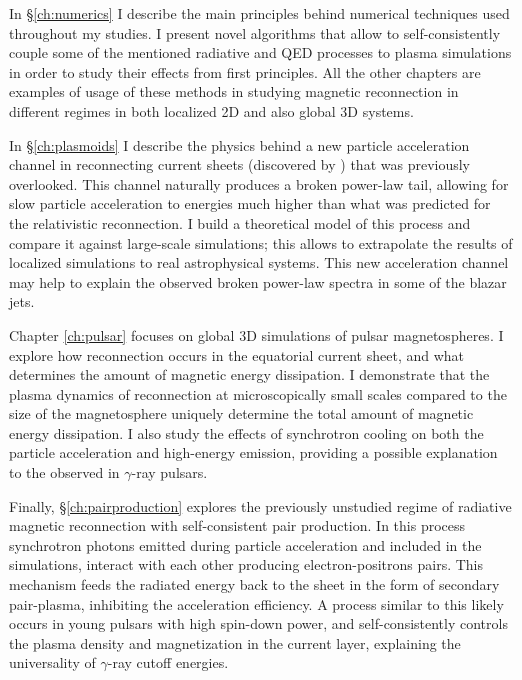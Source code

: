 In \S\ref{ch:numerics} I describe the main principles behind numerical techniques used throughout my studies. I present novel algorithms that allow to self-consistently couple some of the mentioned radiative and QED processes to plasma simulations in order to study their effects from first principles. All the other chapters are examples of usage of these methods in studying magnetic reconnection in different regimes in both localized 2D and also global 3D systems.

In \S\ref{ch:plasmoids} I describe the physics behind a new particle acceleration channel in reconnecting current sheets (discovered by \citealt{2018MNRAS.481.5687P}) that was previously overlooked. This channel naturally produces a broken power-law tail, allowing for slow particle acceleration to energies much higher than what was predicted for the relativistic reconnection. I build a theoretical model of this process and compare it against large-scale simulations; this allows to extrapolate the results of localized simulations to real astrophysical systems. This new acceleration channel may help to explain the observed broken power-law spectra in some of the blazar jets. 

Chapter \ref{ch:pulsar} focuses on global 3D simulations of pulsar magnetospheres. I explore how reconnection occurs in the equatorial current sheet, and what determines the amount of magnetic energy dissipation. I demonstrate that the plasma dynamics of reconnection at microscopically small scales compared to the size of the magnetosphere uniquely determine the total amount of magnetic energy dissipation. I also study the effects of synchrotron cooling on both the particle acceleration and high-energy emission, providing a possible explanation to the observed  in $\gamma$-ray pulsars.

Finally, \S\ref{ch:pairproduction} explores the previously unstudied regime of radiative magnetic reconnection with self-consistent pair production. In this process synchrotron photons emitted during particle acceleration and included in the simulations, interact with each other producing electron-positrons pairs. This mechanism feeds the radiated energy back to the sheet in the form of secondary pair-plasma, inhibiting the acceleration efficiency. A process similar to this likely occurs in young pulsars with high spin-down power, and self-consistently controls the plasma density and magnetization in the current layer, explaining the universality of $\gamma$-ray cutoff energies.